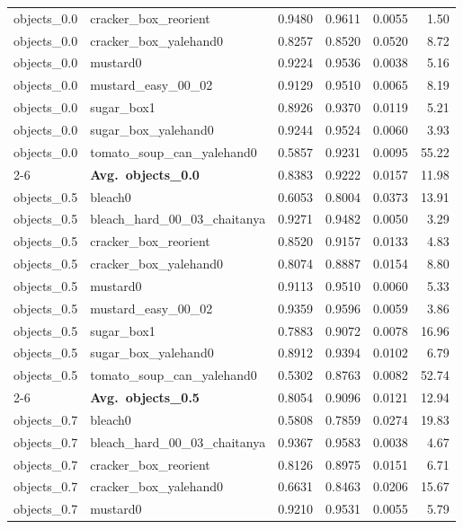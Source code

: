 \begin{longtable}{llrrrr}
  objects_0.0 & cracker\_box\_reorient & 0.9480 & 0.9611 & 0.0055 & 1.50 \\
  objects_0.0 & cracker\_box\_yalehand0 & 0.8257 & 0.8520 & 0.0520 & 8.72 \\
  objects_0.0 & mustard0 & 0.9224 & 0.9536 & 0.0038 & 5.16 \\
  objects_0.0 & mustard\_easy\_00\_02 & 0.9129 & 0.9510 & 0.0065 & 8.19 \\
  objects_0.0 & sugar\_box1 & 0.8926 & 0.9370 & 0.0119 & 5.21 \\
  objects_0.0 & sugar\_box\_yalehand0 & 0.9244 & 0.9524 & 0.0060 & 3.93 \\
  objects_0.0 & tomato\_soup\_can\_yalehand0 & 0.5857 & 0.9231 & 0.0095 & 55.22 \\
  \cmidrule{2-6}
  & \textbf{Avg.~objects_0.0} & 0.8383 & 0.9222 & 0.0157 & 11.98 \\
  \midrule
  objects_0.5 & bleach0 & 0.6053 & 0.8004 & 0.0373 & 13.91 \\
  objects_0.5 & bleach\_hard\_00\_03\_chaitanya & 0.9271 & 0.9482 & 0.0050 & 3.29 \\
  objects_0.5 & cracker\_box\_reorient & 0.8520 & 0.9157 & 0.0133 & 4.83 \\
  objects_0.5 & cracker\_box\_yalehand0 & 0.8074 & 0.8887 & 0.0154 & 8.80 \\
  objects_0.5 & mustard0 & 0.9113 & 0.9510 & 0.0060 & 5.33 \\
  objects_0.5 & mustard\_easy\_00\_02 & 0.9359 & 0.9596 & 0.0059 & 3.86 \\
  objects_0.5 & sugar\_box1 & 0.7883 & 0.9072 & 0.0078 & 16.96 \\
  objects_0.5 & sugar\_box\_yalehand0 & 0.8912 & 0.9394 & 0.0102 & 6.79 \\
  objects_0.5 & tomato\_soup\_can\_yalehand0 & 0.5302 & 0.8763 & 0.0082 & 52.74 \\
  \cmidrule{2-6}
  & \textbf{Avg.~objects_0.5} & 0.8054 & 0.9096 & 0.0121 & 12.94 \\
  \midrule
  objects_0.7 & bleach0 & 0.5808 & 0.7859 & 0.0274 & 19.83 \\
  objects_0.7 & bleach\_hard\_00\_03\_chaitanya & 0.9367 & 0.9583 & 0.0038 & 4.67 \\
  objects_0.7 & cracker\_box\_reorient & 0.8126 & 0.8975 & 0.0151 & 6.71 \\
  objects_0.7 & cracker\_box\_yalehand0 & 0.6631 & 0.8463 & 0.0206 & 15.67 \\
  objects_0.7 & mustard0 & 0.9210 & 0.9531 & 0.0055 & 5.79 \\

\end{longtable}
